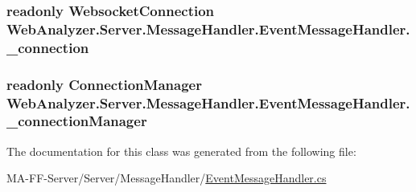 \subsubsection[{\+\_\+connection}]{\setlength{\rightskip}{0pt plus 5cm}readonly {\bf Websocket\+Connection} Web\+Analyzer.\+Server.\+Message\+Handler.\+Event\+Message\+Handler.\+\_\+connection\hspace{0.3cm}{\ttfamily [private]}}\label{class_web_analyzer_1_1_server_1_1_message_handler_1_1_event_message_handler_ab818f2be9cb81fd8854221cc1906d736}
\hypertarget{class_web_analyzer_1_1_server_1_1_message_handler_1_1_event_message_handler_ada36000f38728c974d1cbebc7f716936}{}
\subsubsection[{\+\_\+connection\+Manager}]{\setlength{\rightskip}{0pt plus 5cm}readonly {\bf Connection\+Manager} Web\+Analyzer.\+Server.\+Message\+Handler.\+Event\+Message\+Handler.\+\_\+connection\+Manager\hspace{0.3cm}{\ttfamily [private]}}\label{class_web_analyzer_1_1_server_1_1_message_handler_1_1_event_message_handler_ada36000f38728c974d1cbebc7f716936}


The documentation for this class was generated from the following file\+:\begin{DoxyCompactItemize}
\item 
M\+A-\/\+F\+F-\/\+Server/\+Server/\+Message\+Handler/\hyperlink{_event_message_handler_8cs}{Event\+Message\+Handler.\+cs}\end{DoxyCompactItemize}
